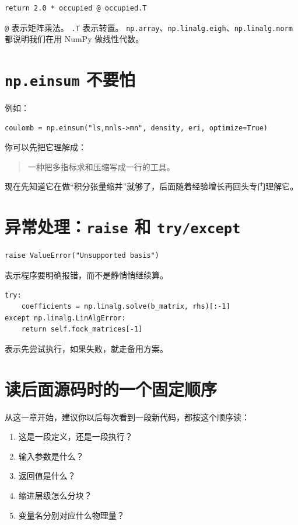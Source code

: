 \documentclass[UTF8,11pt,fontset=fandol]{ctexbook}
\begin{document}
\begin{lstlisting}[style=pythonstyle]
return 2.0 * occupied @ occupied.T
\end{lstlisting}

\texttt{@} 表示矩阵乘法。  
\texttt{.T} 表示转置。  
\texttt{np.array}、\texttt{np.linalg.eigh}、\texttt{np.linalg.norm} 都说明我们在用 NumPy 做线性代数。

\section{\texttt{np.einsum} 不要怕}

例如：
\begin{lstlisting}[style=pythonstyle]
coulomb = np.einsum("ls,mnls->mn", density, eri, optimize=True)
\end{lstlisting}

你可以先把它理解成：

\begin{quote}
一种把多指标求和压缩写成一行的工具。
\end{quote}

现在先知道它在做“积分张量缩并”就够了，后面随着经验增长再回头专门理解它。

\section{异常处理：\texttt{raise} 和 \texttt{try/except}}

\begin{lstlisting}[style=pythonstyle]
raise ValueError("Unsupported basis")
\end{lstlisting}

表示程序要明确报错，而不是静悄悄继续算。

\begin{lstlisting}[style=pythonstyle]
try:
    coefficients = np.linalg.solve(b_matrix, rhs)[:-1]
except np.linalg.LinAlgError:
    return self.fock_matrices[-1]
\end{lstlisting}

表示先尝试执行，如果失败，就走备用方案。

\section{读后面源码时的一个固定顺序}

从这一章开始，建议你以后每次看到一段新代码，都按这个顺序读：

\begin{enumerate}[label=\arabic*.]
  \item 这是一段定义，还是一段执行？
  \item 输入参数是什么？
  \item 返回值是什么？
  \item 缩进层级怎么分块？
  \item 变量名分别对应什么物理量？
\end{enumerate}
\end{document}
